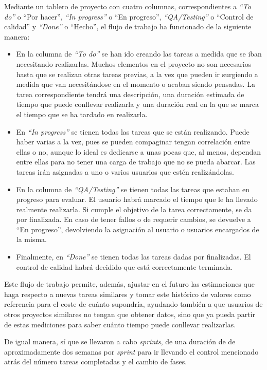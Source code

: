 Mediante un tablero de proyecto con cuatro columnas, correspondientes a \textit{``To do''} o ``Por hacer'', \textit{``In progress''} o ``En progreso'', \textit{``QA/Testing''} o ``Control de calidad'' y \textit{``Done''} o ``Hecho'', el flujo de trabajo ha funcionado de la siguiente manera:
\begin{itemize}
\tightlist
    \item En la columna de \textit{``To do''} se han ido creando las tareas a medida que se iban necesitando realizarlas. Muchos elementos en el proyecto no son necesarios hasta que se realizan otras tareas previas, a la vez que pueden ir surgiendo a medida que van necesitándose en el momento o acaban siendo pensadas. La tarea correspondiente tendrá una descripción, una duración estimada de tiempo que puede conllevar realizarla y una duración real en la que se marca el tiempo que se ha tardado en realizarla.
    \item En \textit{``In progress''} se tienen todas las tareas que se están realizando. Puede haber varias a la vez, pues se pueden compaginar tengan correlación entre ellas o no, aunque lo ideal es dedicarse a unas pocas que, al menos, dependan entre ellas para no tener una carga de trabajo que no se pueda abarcar. Las tareas irán asignadas a uno o varios usuarios que estén realizándolas.
    \item En la columna de \textit{``QA/Testing''} se tienen todas las tareas que estaban en progreso para evaluar. El usuario habrá marcado el tiempo que le ha llevado realmente realizarla. Si cumple el objetivo de la tarea correctamente, se da por finalizada. En caso de tener fallos o de requerir cambios, se devuelve a ``En progreso'', devolviendo la asignación al usuario o usuarios encargados de la misma.
    \item Finalmente, en \textit{``Done''} se tienen todas las tareas dadas por finalizadas. El control de calidad habrá decidido que está correctamente terminada.
\end{itemize}

Este flujo de trabajo permite, además, ajustar en el futuro las estimaciones que haga respecto a nuevas tareas similares y tomar este histórico de valores como referencia para el coste de cuánto supondría, ayudando también a que usuarios de otros proyectos similares no tengan que obtener datos, sino que ya pueda partir de estas mediciones para saber cuánto tiempo puede conllevar realizarlas.

De igual manera, sí que se llevaron a cabo \textit{sprints}, de una duración de de aproximadamente dos semanas por \textit{sprint} para ir llevando el control mencionado atrás del número tareas completadas y el cambio de fases.

